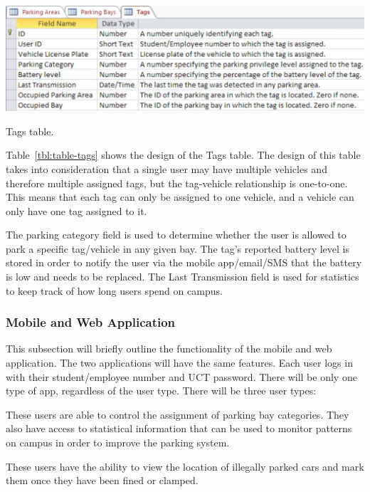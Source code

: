 
\begin{table}[H]
\begin{center}
\includegraphics[scale=0.5]{data/software/7.jpg}
\caption{Tags table.}
\label{tbl:table-tags}
\end{center}
\end{table}

Table~\ref{tbl:table-tags} shows the design of the Tags table. The design of this table takes into consideration that a single user may have multiple vehicles and therefore multiple assigned tags, but the tag-vehicle relationship is one-to-one. This means that each tag can only be assigned to one vehicle, and a vehicle can only have one tag assigned to it.

\newpage
The parking category field is used to determine whether the user is allowed to park a specific tag/vehicle in any given bay. The tag's reported battery level is stored in order to notify the user via the mobile app/email/SMS that the battery is low and needs to be replaced.
The Last Transmission field is used for statistics to keep track of how long users spend on campus.

\subsubsection{Mobile and Web Application}

This subsection will briefly outline the functionality of the mobile and web application. The two applications will have the same features. Each user logs in with their student/employee number and UCT password. There will be only one type of app, regardless of the user type. There will be three user types:

These users are able to control the assignment of parking bay categories. They also have access to statistical information that can be used to monitor patterns on campus in order to improve the parking system.

These users have the ability to view the location of illegally parked cars and mark them once they have been fined or clamped.

